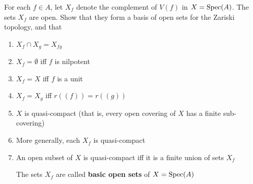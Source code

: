 \documentclass[11pt]{article}
\begin{document}
\begin{exercise}
\label{ex1.17}
For each \(f\in A\), let \(X_f\) denote the complement of \(V(f)\) in \(X=\operatorname{Spec}(A)\). The
sets \(X_f\) are open. Show that they form a basis of open sets for the Zariski topology, and
that
\begin{enumerate}
\item \(X_f\cap X_g=X_{fg}\)
\item \(X_f=\emptyset\) iff \(f\) is nilpotent
\item \(X_f=X\) iff \(f\) is a unit
\item \(X_f=X_g\) iff \(r((f))=r((g))\)
\item \(X\) is quasi-compact (that is, every open covering of \(X\) has a finite sub-covering)
\item More generally, each \(X_f\) is quasi-compact
\item An open subset of \(X\) is quasi-compact iff it is a finite union of sets \(X_f\)

The sets \(X_f\) are called \textbf{basic open sets} of \(X=\operatorname{Spec}(A)\)
\end{enumerate}
\end{exercise}
\end{document}
